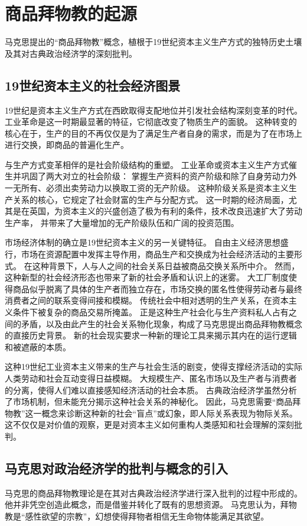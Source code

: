 \section{商品拜物教的起源}
马克思提出的“商品拜物教”概念，植根于19世纪资本主义生产方式的独特历史土壤及其对古典政治经济学的深刻批判。
\subsection{19世纪资本主义的社会经济图景}
19世纪是资本主义生产方式在西欧取得支配地位并引发社会结构深刻变革的时代。
工业革命是这一时期最显著的特征，它彻底改变了物质生产的面貌\autocite{jinji}。
这种转变的核心在于，生产的目的不再仅仅是为了满足生产者自身的需求，而是为了在市场上进行交换，即商品的普遍化生产\autocite{jinji}。

与生产方式变革相伴的是社会阶级结构的重塑。
工业革命或资本主义生产方式催生并巩固了两大对立的社会阶级：
掌握生产资料的资产阶级和除了自身劳动力外一无所有、必须出卖劳动力以换取工资的无产阶级。
这种阶级关系是资本主义生产关系的核心，它规定了社会财富的生产与分配方式。
这一时期的经济局面，尤其是在英国，为资本主义的兴盛创造了极为有利的条件，技术改良迅速扩大了劳动生产率，
并带来了大量增加的无产阶级队伍和广阔的投资范围。

市场经济体制的确立是19世纪资本主义的另一关键特征。
自由主义经济思想盛行，市场在资源配置中发挥主导作用，商品生产和交换成为社会经济活动的主要形式。
在这种背景下，人与人之间的社会关系日益被商品交换关系所中介。
然而，这种新型的社会经济形态也带来了新的社会矛盾和认识上的迷雾。
大工厂制度使得商品似乎脱离了具体的生产者而独立存在，市场交换的匿名性使得劳动者与最终消费者之间的联系变得间接和模糊。
传统社会中相对透明的生产关系，在资本主义条件下被复杂的商品交易所掩盖。
正是这种生产社会化与生产资料私人占有之间的矛盾，以及由此产生的社会关系物化现象，构成了马克思提出商品拜物教概念的直接历史背景。
新的社会现实要求一种新的理论工具来揭示其内在的运行逻辑和被遮蔽的本质。

这种19世纪工业资本主义带来的生产与社会生活的剧变，使得支撑经济活动的实际人类劳动和社会互动变得日益模糊。
大规模生产、匿名市场以及生产者与消费者的分离，使得人们难以直接感知经济活动的社会本质。
古典政治经济学虽然分析了市场机制，但未能充分揭示这种社会关系的神秘化。
因此，马克思需要“商品拜物教”这一概念来诊断这种新的社会“盲点”或幻象，即人际关系表现为物际关系。
这不仅仅是对价值的观察，更是对资本主义如何重构人类感知和社会理解的深刻批判。


\subsection{马克思对政治经济学的批判与概念的引入}
马克思的商品拜物教理论是在其对古典政治经济学进行深入批判的过程中形成的。
他并非凭空创造此概念，而是借鉴并转化了既有的思想资源。
马克思认为，拜物教是“感性欲望的宗教”，幻想使得拜物者相信无生命物体能满足其欲望。

